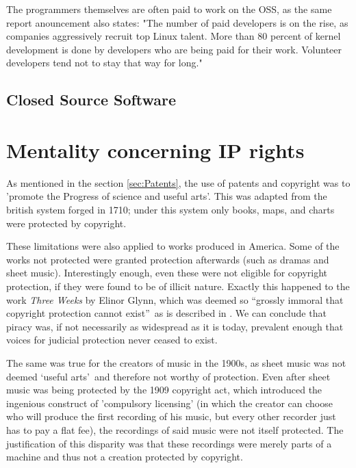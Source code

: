 \documentclass[a4paper]{report}
\begin{document}
The programmers themselves are often paid to work on the OSS, as the same report anouncement also states: "The number of paid developers is on the rise, as companies aggressively recruit top Linux talent. More than 80 percent of kernel development is done by developers who are being paid for their work. Volunteer developers tend not to stay that way for long."


\subsection{Closed Source Software}
\label{ssec:CSS}

\section{Mentality concerning IP rights}
\label{sec:IPMent}

As mentioned in the section \ref{sec:Patents}, the use of patents and copyright was to 'promote the Progress of science and useful arts'. This was adapted from the british system forged in 1710; under this system only books, maps, and charts were protected by copyright. \parencite[3]{Cummings2010}

These limitations were also applied to works produced in America. Some of the works not protected were granted protection afterwards (such as dramas and sheet music). Interestingly enough, even these were not eligible for copyright protection, if they were found to be of illicit nature.  Exactly this happened to the work \textit{Three Weeks} by Elinor Glynn, which was deemed so \textquotedblleft grossly immoral that copyright protection cannot exist\textquotedblright\ as is described in \cite{Fox1945}.
We can conclude that piracy was, if not necessarily as widespread as it is today, prevalent enough that voices for judicial protection never ceased to exist.

The same was true for the creators of music in the 1900s, as sheet music was not deemed \textquoteleft useful arts\textquoteright\ and therefore not worthy of protection. Even after sheet music was being protected by the 1909 copyright act, which introduced the ingenious construct of 'compulsory licensing' (in which the creator can choose who will produce the first recording of his music, but every other recorder just has to pay a flat fee), the recordings of said music were not itself protected. The justification of this disparity was that these recordings were merely parts of a machine and thus not a creation protected by copyright.
\end{document}
